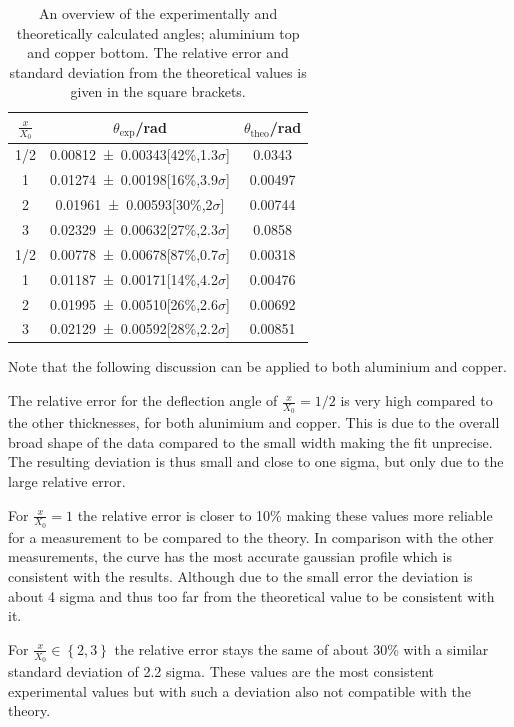 \documentclass[sn-mathphys-num,iicol]{sn-jnl}
\theoremstyle{thmstyleone}
\theoremstyle{thmstyletwo}
\theoremstyle{thmstylethree}
\begin{document}
\begin{table}
  \begin{tabular}{ccc}
    \toprule
    $\tfrac{x}{X_0}$ & $\theta _\text{exp}$/rad & $\theta _\text{theo}$/rad \\
    \midrule
    1/2 & \num{.00812+-.00343}[42\%,1.3$\sigma$] & 0.0343\\
    1 & \num{.01274+-.00198}[16\%,3.9$\sigma$] & 0.00497\\
    2 & \num{.01961+-.00593}[30\%,2$\sigma$] & 0.00744\\
    3 & \num{.02329+-.00632}[27\%,2.3$\sigma$] & 0.0858\\
    \midrule
    1/2 & \num{.00778+-.00678}[87\%,0.7$\sigma$] & 0.00318\\
    1 & \num{.01187+-.00171}[14\%,4.2$\sigma$] & 0.00476\\
    2 & \num{.01995+-.00510}[26\%,2.6$\sigma$] & 0.00692\\
    3 & \num{.02129+-.00592}[28\%,2.2$\sigma$] & 0.00851\\
    \bottomrule
  \end{tabular}
  \caption{An overview of the experimentally and theoretically calculated angles; aluminium top and copper bottom. 
  The relative error and standard deviation from the theoretical values is given in the square brackets.}
\end{table}
Note that the following discussion can be applied to both aluminium and copper.

The relative error for the deflection angle of $\tfrac{x}{X_0}=1/2$ is very high compared to the other thicknesses, for both alunimium and copper.
This is due to the overall broad shape of the data compared to the small width making the fit unprecise.
The resulting deviation is thus small and close to one sigma, but only due to the large relative error.

For $\tfrac{x}{X_0}=1$ the relative error is closer to 10\% making these values more reliable for a measurement to be compared to the theory.
In comparison with the other measurements, the curve has the most accurate gaussian profile which is consistent with the results.
Although due to the small error the deviation is about 4 sigma and thus too far from the theoretical value to be consistent with it.

For $\tfrac{x}{X_0} \in \left\{2,3\right\}$ the relative error stays the same of about 30\% with a similar standard deviation of 2.2 sigma.
These values are the most consistent experimental values but with such a deviation also not compatible with the theory.
\end{document}
